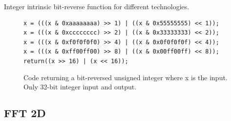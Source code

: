 \begin{table}
	\centering
	
	\caption{Integer intrinsic bit-reverse function for different technologies.}
	\label{tab:bit-reverse-intrinsics}
\end{table}

\begin{figure}
	\centering
	\lstset{language=C++}
	\begin{framed}
	\begin{lstlisting}
x = (((x & 0xaaaaaaaa) >> 1) | ((x & 0x55555555) << 1));
x = (((x & 0xcccccccc) >> 2) | ((x & 0x33333333) << 2));
x = (((x & 0xf0f0f0f0) >> 4) | ((x & 0x0f0f0f0f) << 4));
x = (((x & 0xff00ff00) >> 8) | ((x & 0x00ff00ff) << 8));
return((x >> 16) | (x << 16));
	\end{lstlisting}
	\end{framed}
	\caption{ Code returning a bit-reversed unsigned integer where x is the input. Only 32-bit integer input and output. }
	\label{fig:code-bit-reverse}
\end{figure}

\subsection{FFT 2D}

